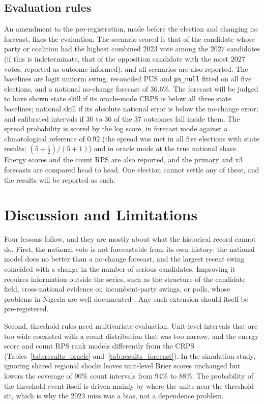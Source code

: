 \documentclass[preprint,12pt,authoryear]{elsarticle}
\begin{document}
\subsection{Evaluation rules}
An amendment to the pre-registration, made before the election and changing no forecast, fixes the evaluation. The scenario scored is that of the candidate whose party or coalition had the highest combined 2023 vote among the 2027 candidates (if this is indeterminate, that of the opposition candidate with the most 2027 votes, reported as outcome-informed), and all scenarios are also reported. The baselines are logit uniform swing, reconciled PUS and \texttt{ps\_null} fitted on all five elections, and a national no-change forecast of 36.6\%. The forecast will be judged to have shown state skill if its oracle-mode CRPS is below all three state baselines; national skill if its absolute national error is below the no-change error; and calibrated intervals if 30 to 36 of the 37 outcomes fall inside them. The spread probability is scored by the log score, in forecast mode against a climatological reference of 0.92 (the spread was met in all five elections with state results; $(5+\tfrac12)/(5+1)$) and in oracle mode at the true national share. Energy scores and the count RPS are also reported, and the primary and v3 forecasts are compared head to head. One election cannot settle any of these, and the results will be reported as such.

\fussy
\section{Discussion and Limitations}
\label{sec:discussion}
Four lessons follow, and they are mostly about what the historical record cannot do. First, the national vote is not forecastable from its own history: the national model does no better than a no-change forecast, and the largest recent swing coincided with a change in the number of serious candidates. Improving it requires information outside the series, such as the structure of the candidate field, cross-national evidence on incumbent-party swings, or polls, whose problems in Nigeria are well documented \citep{Mohammed2024OpinionPolls}. Any such extension should itself be pre-registered.

Second, threshold rules need multivariate evaluation. Unit-level intervals that are too wide coexisted with a count distribution that was too narrow, and the energy score and count RPS rank models differently from the CRPS (Tables~\ref{tab:results_oracle} and~\ref{tab:results_forecast}). In the simulation study, ignoring shared regional shocks leaves unit-level Brier scores unchanged but lowers the coverage of 90\% count intervals from 94\% to 88\%. The probability of the threshold event itself is driven mainly by where the units near the threshold sit, which is why the 2023 miss was a bias, not a dependence problem.
\end{document}
